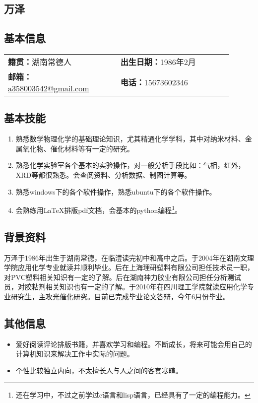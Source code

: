 \documentclass[11pt,oneside]{book}
\begin{document}
\begin{common-format}

\chapter{万泽}
\vspace{15pt}

\section{基本信息}

\noindent
\begin{tabular}{p{0.45\linewidth} p{0.45\linewidth}}
\textbf{籍贯：}湖南常德人 & \textbf{出生日期：}1986年2月 \\ 
\textbf{邮箱：}\href{mailto: a358003542@gmail.com}{a358003542@gmail.com} & \textbf{电话：}15673602346 \\ 
\end{tabular} 


\section{基本技能}
\vspace{-5mm}
\begin{enumerate}
\item 熟悉数学物理化学的基础理论知识，尤其精通化学学科，其中对纳米材料、金属氧化物、催化材料等有一定的研究。
\item 熟悉化学实验室各个基本的实验操作，对一般分析手段比如：气相，红外，XRD等都很熟悉。会查阅资料、分析数据、制图计算等。
\item 熟悉windows下的各个软件操作，熟悉ubuntu下的各个软件操作。
\item 会熟练用\LaTeX 排版pdf文档，会基本的python编程\footnote{还在学习中，不过之前学过c语言和lisp语言，已经具有了一定的编程能力。}。
\end{enumerate}


\section{背景资料}
万泽于1986年出生于湖南常德，在临澧读完初中和高中之后。于2004年在湖南文理学院应用化学专业就读并顺利毕业。后在上海理研塑料有限公司担任技术员一职，对PVC塑料相关知识有一定的了解。后在湖南神力胶业有限公司担任分析测试员，对胶粘剂相关知识也有一定的了解。于2010年在四川理工学院就读应用化学专业研究生，主攻光催化研究。目前已完成毕业论文答辩，今年6月份毕业。

\section{其他信息}
\vspace{-5mm}
\begin{itemize}
\item 爱好阅读评论排版书籍，并喜欢学习和编程。不断成长，将来可能会用自己的计算机知识来解决工作中实际的问题。
\item 个性比较独立内向，不太擅长人与人之间的客套寒暄。
\end{itemize}



\end{common-format}
\end{document}
